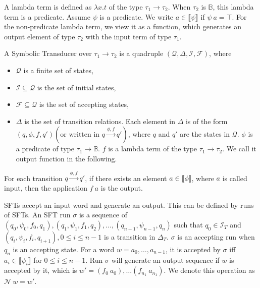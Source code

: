 \documentclass[a4paper,UKenglish,cleveref, autoref, thm-restate]{lipics-v2021}
\begin{document}
A lambda term is defined as $\lambda x. t$ of the type $\tau_1 \rightarrow \tau_2$.
When $\tau_2$ is $\mathbb{B}$, this lambda term is a predicate. Assume $\psi$ is a predicate. We write $a\in \llbracket\psi \rrbracket$ if $\psi~a=\top$. For the non-predicate lambda term, we view it as a function, which generates an output element of type $\tau_2$ with the input term of type $\tau_1$. 

\begin{definition}
\label{def-sft}
   A Symbolic Transducer over $\tau_1\rightarrow \tau_2$ is a quadruple $(\mathcal{Q}, \Delta, \mathcal{I}, \mathcal{F})$, where 
   \begin{itemize}
   \item $\mathcal{Q}$ is a finite set of states,
   \item $\mathcal{I}\subseteq \mathcal{Q}$ is the set of initial states,
   \item $\mathcal{F} \subseteq\mathcal{Q}$ is the set of accepting states,
   \item $\Delta$ is the set of transition relations. Each element in $\Delta$ is of the form $(q, \phi, f, q') (\text{or written in } q\xrightarrow{\phi, f} q')$, where $q$ and $q'$ are the states in $\mathcal{Q}$.
   $\phi$ is a predicate of type $\tau_1\rightarrow \mathbb{B}$.
   $f$ is a lambda term of the type $\tau_1\rightarrow \tau_2$. We call it output function in the following.
   \end{itemize}

For each transition $q\xrightarrow{\phi, f} q'$, if there exists an element $a\in \llbracket \phi \rrbracket$, where $a$ is called input,  then the application $f~a$ is the output.
   
\end{definition}

SFTs accept an input word and generate an output. This can be defined by runs of SFTs.
An SFT run $\sigma$ is a sequence of $(q_0, \psi_0, f_0, q_1),(q_1, \psi_1, f_1, q_2),\ldots, (q_{n-1}, \psi_{n-1}, q_n)$ such that $q_0\in \mathcal{I}_T$ and $(q_i, 
\psi_i, f_i, q_{i+1}), 0 \leq i \leq n-1$ is a transition in $\Delta_T$.
$\sigma$ is an accepting run when $q_n$ is an accepting state.
For a word $w = a_0,\ldots, a_{n-1}$, it is accepted by $\sigma$ iff $a_i \in \llbracket\psi_i \rrbracket$ for $0 \leq i \leq n - 1$. Run $\sigma$ will generate an output sequence if $w$ is accepted by it, which is $w'= (f_0~a_0), \ldots (f_{n_1}~a_{n_1})$. We denote this operation as $\mathcal{N}~w = w'$.
\end{document}
